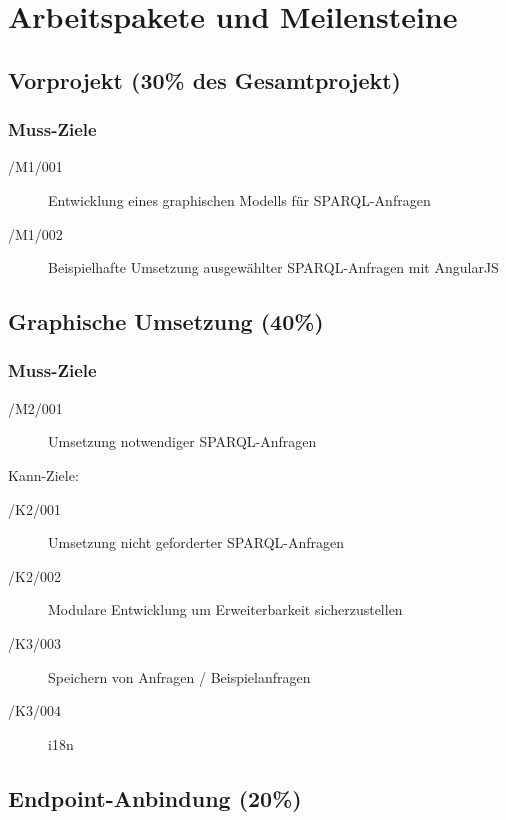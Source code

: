 \section{Arbeitspakete und Meilensteine}

\subsection{Vorprojekt (30\% des Gesamtprojekt)}

\subsubsection*{Muss-Ziele}

\begin{description}
\item[/M1/001] Entwicklung eines graphischen Modells für SPARQL-Anfragen
\item[/M1/002] Beispielhafte Umsetzung ausgewählter SPARQL-Anfragen mit AngularJS
\end{description}

\subsection{Graphische Umsetzung (40\%)}

\subsubsection*{Muss-Ziele}

\begin{description}
\item[/M2/001] Umsetzung notwendiger SPARQL-Anfragen
\end{description}

Kann-Ziele:
\begin{description}
\item[/K2/001] Umsetzung nicht geforderter SPARQL-Anfragen
\item[/K2/002] Modulare Entwicklung um Erweiterbarkeit sicherzustellen
\item[/K3/003] Speichern von Anfragen / Beispielanfragen
\item[/K3/004] i18n
\end{description}

\subsection{Endpoint-Anbindung (20\%)}

